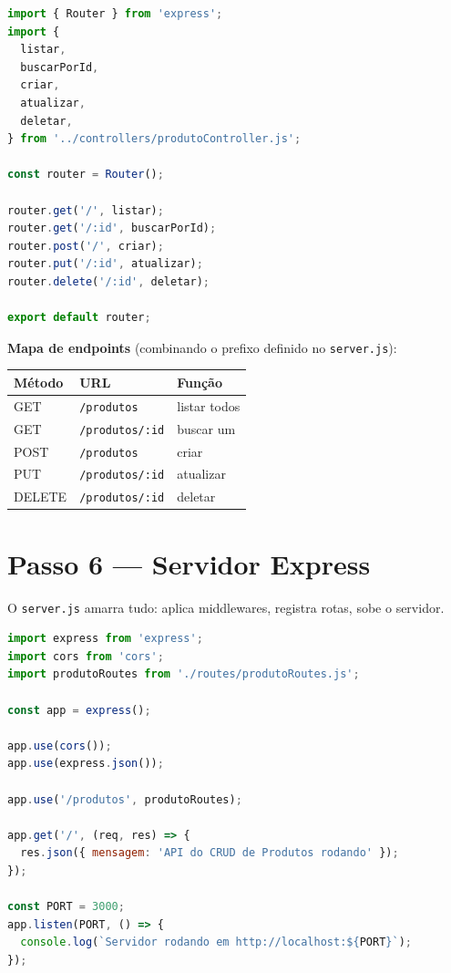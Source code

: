 \documentclass[11pt,a4paper]{article}
\begin{document}
\begin{lstlisting}[language=JavaScript, caption={\texttt{backend/src/routes/produtoRoutes.js}}]
import { Router } from 'express';
import {
  listar,
  buscarPorId,
  criar,
  atualizar,
  deletar,
} from '../controllers/produtoController.js';

const router = Router();

router.get('/', listar);
router.get('/:id', buscarPorId);
router.post('/', criar);
router.put('/:id', atualizar);
router.delete('/:id', deletar);

export default router;
\end{lstlisting}

\textbf{Mapa de endpoints} (combinando o prefixo definido no \texttt{server.js}):

\begin{center}
\begin{tabular}{lll}
\toprule
\textbf{Método} & \textbf{URL} & \textbf{Função} \\
\midrule
GET    & \texttt{/produtos}     & listar todos \\
GET    & \texttt{/produtos/:id} & buscar um \\
POST   & \texttt{/produtos}     & criar \\
PUT    & \texttt{/produtos/:id} & atualizar \\
DELETE & \texttt{/produtos/:id} & deletar \\
\bottomrule
\end{tabular}
\end{center}

\section{Passo 6 --- Servidor Express}

O \texttt{server.js} amarra tudo: aplica middlewares, registra rotas, sobe o servidor.

\begin{lstlisting}[language=JavaScript, caption={\texttt{backend/src/server.js}}]
import express from 'express';
import cors from 'cors';
import produtoRoutes from './routes/produtoRoutes.js';

const app = express();

app.use(cors());
app.use(express.json());

app.use('/produtos', produtoRoutes);

app.get('/', (req, res) => {
  res.json({ mensagem: 'API do CRUD de Produtos rodando' });
});

const PORT = 3000;
app.listen(PORT, () => {
  console.log(`Servidor rodando em http://localhost:${PORT}`);
});
\end{lstlisting}
\end{document}
